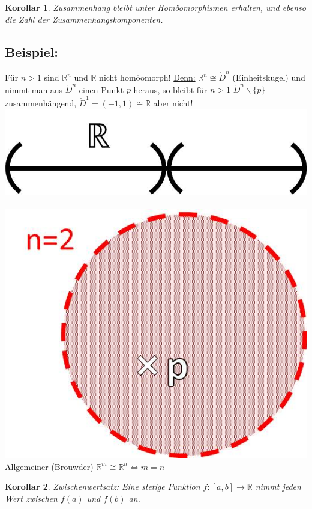 \documentclass[a4paper,11pt,notitlepage]{report}
\newtheorem{corollary}{Korollar}[chapter]
\newcommand{\R}{{\ensuremath{\mathbb{R}}}}
\newenvironment{bsp}[1]
{
\setlength{\fboxsep}{10pt}
\subsection*{Beispiel: #1}
\begin{upshape}
}
{
\end{upshape}
}
\begin{document}
\begin{corollary}
	Zusammenhang bleibt unter Homöomorphismen erhalten, und ebenso die Zahl der Zusammenhangskomponenten.
\end{corollary}

\begin{bsp}{}
	Für $n > 1$ sind $\R^n$ und $\R$ nicht homöomorph!
	\newline
	\underline{Denn:} $\R^n \cong \mathring{D}^n$ (Einheitskugel) und nimmt man aus $\mathring{D}^n$ einen Punkt $p$ heraus, so bleibt für $n>1$ $\mathring{D}^n \backslash \{p\}$ zusammenhängend, $\mathring{D}^1 = (-1,1) \cong \R$ aber nicht!
	\newline
\includegraphics[scale=0.4]{images/R_ohne_p.jpg}$\qquad\qquad$
\includegraphics[scale=0.4]{images/R2_ohne_p.jpg}
	\newline
	\underline{Allgemeiner (Brouwder)} $\R^m \cong \R^n \Leftrightarrow m=n$
\end{bsp}

\begin{corollary}{Zwischenwertsatz:}
	Eine stetige Funktion $f \colon [a,b] \rightarrow \R$ nimmt jeden Wert zwischen $f(a)$ und $f(b)$ an.
\end{corollary}
\end{document}
